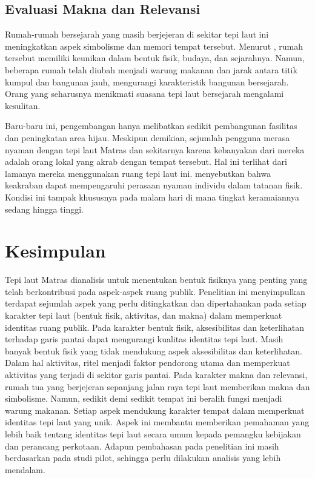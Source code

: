 \documentclass[11pt]{simart} %
\begin{document}
\subsection{Evaluasi Makna dan Relevansi}%
\label{sub:Evaluasi Makna dan Relevansi}


Rumah-rumah bersejarah yang masih berjejeran di sekitar tepi laut ini meningkatkan aspek simbolisme dan memori tempat tersebut. Menurut \cite{iqbal2020}, rumah tersebut memiliki keunikan dalam bentuk fisik, budaya, dan sejarahnya. Namun, beberapa rumah telah diubah menjadi warung makanan dan jarak antara titik kumpul dan bangunan jauh, mengurangi karakteristik bangunan bersejarah. Orang yang seharusnya menikmati suasana tepi laut bersejarah mengalami kesulitan.


Baru-baru ini, pengembangan hanya melibatkan sedikit pembangunan fasilitas dan peningkatan area hijau. Meskipun demikian, sejumlah pengguna merasa nyaman dengan tepi laut Matras dan sekitarnya karena kebanyakan dari mereka adalah orang lokal yang akrab dengan tempat tersebut. Hal ini terlihat dari lamanya mereka menggunakan ruang tepi laut ini. \cite{ujang2017} menyebutkan bahwa keakraban dapat mempengaruhi perasaan nyaman individu dalam tatanan fisik. Kondisi ini tampak khususnya pada malam hari di mana tingkat keramaiannya sedang hingga tinggi.


\section{Kesimpulan}%
\label{sec:Kesimpulan}

Tepi laut Matras dianalisis untuk menentukan bentuk fisiknya yang penting yang telah berkontribusi pada aspek-aspek ruang publik. Penelitian ini menyimpulkan terdapat sejumlah aspek yang perlu ditingkatkan dan dipertahankan pada setiap karakter tepi laut (bentuk fisik, aktivitas, dan makna) dalam memperkuat identitas ruang publik. Pada karakter bentuk fisik, aksesibilitas dan keterlihatan terhadap garis pantai dapat mengurangi kualitas identitas tepi laut. Masih banyak bentuk fisik yang tidak mendukung aspek aksesibilitas dan keterlihatan. Dalam hal aktivitas, ritel menjadi faktor pendorong utama dan memperkuat aktivitas yang terjadi di sekitar garis pantai. Pada karakter makna dan relevansi, rumah tua yang berjejeran sepanjang jalan raya tepi laut memberikan makna dan simbolisme. Namun, sedikit demi sedikit tempat ini beralih fungsi menjadi warung makanan. Setiap aspek mendukung karakter tempat dalam memperkuat identitas tepi laut yang unik. Aspek ini membantu memberikan pemahaman yang lebih baik tentang identitas tepi laut secara umum kepada pemangku kebijakan dan perancang perkotaan. Adapun pembahasan pada penelitian ini masih berdasarkan pada studi pilot, sehingga perlu dilakukan analisis yang lebih mendalam.






% 

\end{document}
